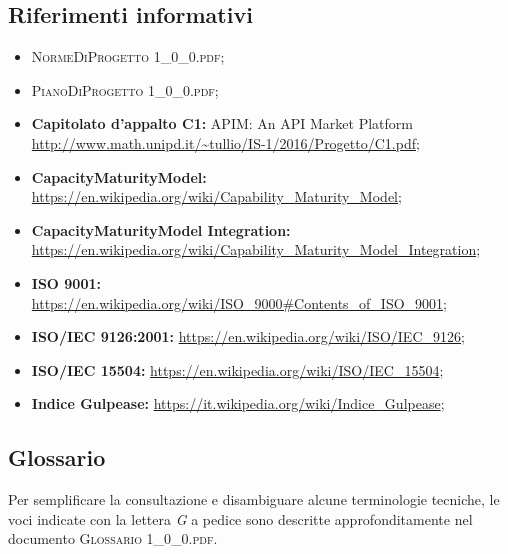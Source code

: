 \subsection{Riferimenti informativi}
\begin{itemize}
	\item \textsc{NormeDiProgetto 1\_0\_0.pdf};
	\item \textsc{PianoDiProgetto 1\_0\_0.pdf};
	\item \textbf{Capitolato d’appalto C1:} APIM: An API Market Platform\\ \url{http://www.math.unipd.it/~tullio/IS-1/2016/Progetto/C1.pdf};
	\item \textbf{CapacityMaturityModel:} \url{https://en.wikipedia.org/wiki/Capability_Maturity_Model};
	\item \textbf{CapacityMaturityModel Integration:} \url{https://en.wikipedia.org/wiki/Capability_Maturity_Model_Integration};
	\item \textbf{ISO 9001:} \url{https://en.wikipedia.org/wiki/ISO_9000#Contents_of_ISO_9001};
	\item \textbf{ISO/IEC 9126:2001:} \url{https://en.wikipedia.org/wiki/ISO/IEC_9126};
	\item \textbf{ISO/IEC 15504:} \url{https://en.wikipedia.org/wiki/ISO/IEC_15504};
	\item \textbf{Indice Gulpease:} \url{https://it.wikipedia.org/wiki/Indice_Gulpease};
	
\end{itemize}


\subsection{Glossario}
Per semplificare la consultazione e disambiguare alcune terminologie tecniche, le voci indicate con la lettera \textit{G} a pedice sono descritte approfonditamente nel documento \textsc{Glossario 1\_0\_0.pdf}.